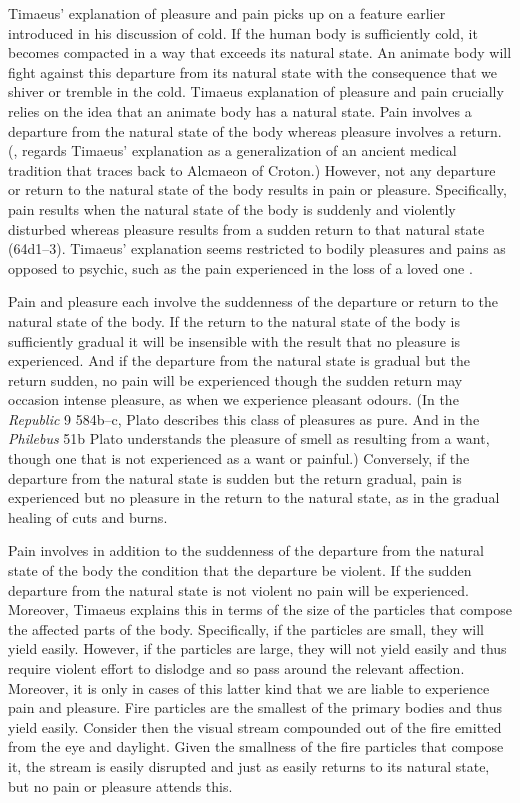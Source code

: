 Timaeus' explanation of pleasure and pain picks up on a feature earlier introduced in his discussion of cold. If the human body is sufficiently cold, it becomes compacted in a way that exceeds its natural state. An animate body will fight against this departure from its natural state with the consequence that we shiver or tremble in the cold. Timaeus explanation of pleasure and pain crucially relies on the idea that an animate body has a natural state. Pain involves a departure from the natural state of the body whereas pleasure involves a return. (\citealt[448--9]{Taylor:1928qb}, regards Timaeus' explanation as a generalization of an ancient medical tradition that traces back to Alcmaeon of Croton.) However, not any departure or return to the natural state of the body results in pain or pleasure. Specifically, pain results when the natural state of the body is suddenly and violently disturbed whereas pleasure results from a sudden return to that natural state (64d1--3). Timaeus' explanation seems restricted to bodily pleasures and pains as opposed to psychic, such as the pain experienced in the loss of a loved one \citep[447--8]{Taylor:1928qb}.

Pain and pleasure each involve the suddenness of the departure or return to the natural state of the body. If the return to the natural state of the body is sufficiently gradual it will be insensible with the result that no pleasure is experienced. And if the departure from the natural state is gradual but the return sudden, no pain will be experienced though the sudden return may occasion intense pleasure, as when we experience pleasant odours. (In the \emph{Republic} 9 584b--c, Plato describes this class of pleasures as pure. And in the \emph{Philebus} 51b Plato understands the pleasure of smell as resulting from a want, though one that is not experienced as a want or painful.) Conversely, if the departure from the natural state is sudden but the return gradual, pain is experienced but no pleasure in the return to the natural state, as in the gradual healing of cuts and burns.

Pain involves in addition to the suddenness of the departure from the natural state of the body the condition that the departure be violent. If the sudden departure from the natural state is not violent no pain will be experienced. Moreover, Timaeus explains this in terms of the size of the particles that compose the affected parts of the body. Specifically, if the particles are small, they will yield easily. However, if the particles are large, they will not yield easily and thus require violent effort to dislodge and so pass around the relevant affection. Moreover, it is only in cases of this latter kind that we are liable to experience pain and pleasure. Fire particles are the smallest of the primary bodies and thus yield easily. Consider then the visual stream compounded out of the fire emitted from the eye and daylight. Given the smallness of the fire particles that compose it, the stream is easily disrupted and just as easily returns to its natural state, but no pain or pleasure attends this.

